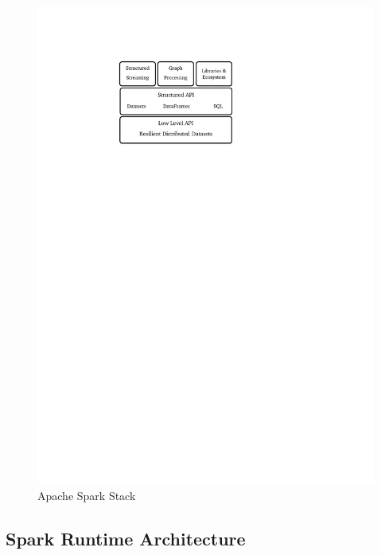 \begin{figure}[h]
    \centering
    \includegraphics[clip,trim=5cm 21.1cm 8.7cm 3.4cm]{spark-eco.pdf}
    \caption{Apache Spark Stack}
    \label{fig:spark-eco}
\end{figure}

\subsection{Spark Runtime Architecture}
\label{sp:run}

